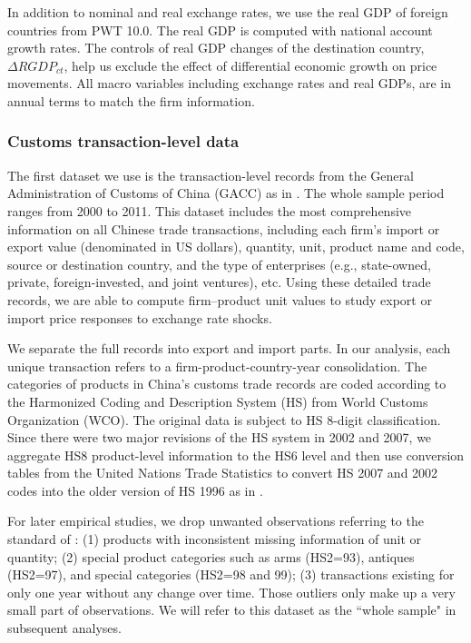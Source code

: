 \documentclass[12pt]{article}
\begin{document}
In addition to nominal and real exchange rates, we use the real GDP of foreign countries from PWT 10.0. The real GDP is computed with national account growth rates. The controls of real GDP changes of the destination country, $\Delta RGDP_{ct}$, help us exclude the effect of differential economic growth on price movements. All macro variables including exchange rates and real GDPs, are in annual terms to match the firm information.

\subsubsection{Customs transaction-level data} \label{Data-Customs}

The first dataset we use is the transaction-level records from the General Administration of Customs of China (GACC) as in \cite{manova-zhang2012}. The whole sample period ranges from 2000 to 2011. This dataset includes the most comprehensive information on all Chinese trade transactions, including each firm's import or export value (denominated in US dollars), quantity, unit, product name and code, source or destination country, and the type of enterprises (e.g., state-owned, private, foreign-invested, and joint ventures), etc. Using these detailed trade records, we are able to compute firm–product unit values to study export or import price responses to exchange rate shocks. 

We separate the full records into export and import parts. In our analysis, each unique transaction refers to a firm-product-country-year consolidation. The categories of products in China's customs trade records are coded according to the Harmonized Coding and Description System (HS) from World Customs Organization (WCO). The original data is subject to HS 8-digit classification. Since there were two major revisions of the HS system in 2002 and 2007, we aggregate HS8 product-level information to the HS6 level and then use conversion tables from the United Nations Trade Statistics to convert HS 2007 and 2002 codes into the older version of HS 1996 as in \cite{fan-li-yeaple2015}.

For later empirical studies, we drop unwanted observations referring to the standard of \cite{lmx2015}: (1) products with inconsistent missing information of unit or quantity; (2) special product categories such as arms (HS2=93), antiques (HS2=97), and special categories (HS2=98 and 99); (3) transactions existing for only one year without any change over time. Those outliers only make up a very small part of observations. We will refer to this dataset as the ``whole sample" in subsequent analyses.
\end{document}
